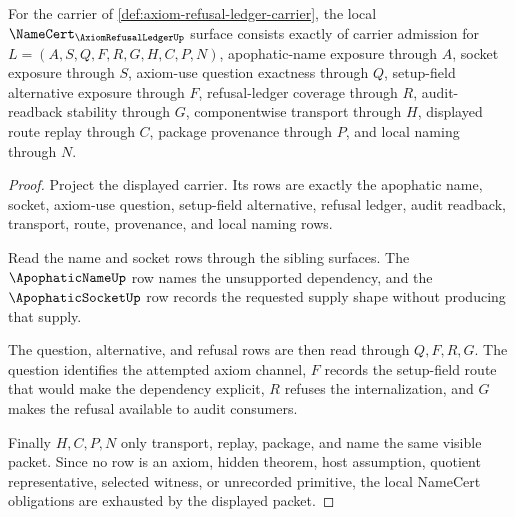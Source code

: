 \begin{theorem}
\label{thm:axiom-refusal-ledger-namecert-obligations}
For the carrier of \autoref{def:axiom-refusal-ledger-carrier}, the local $\NameCert_{\AxiomRefusalLedgerUp}$ surface consists exactly of carrier admission for $L=(A,S,Q,F,R,G,H,C,P,N)$, apophatic-name exposure through $A$, socket exposure through $S$, axiom-use question exactness through $Q$, setup-field alternative exposure through $F$, refusal-ledger coverage through $R$, audit-readback stability through $G$, componentwise transport through $H$, displayed route replay through $C$, package provenance through $P$, and local naming through $N$.
\end{theorem}
\begin{proof}
Project the displayed carrier. Its rows are exactly the apophatic name, socket, axiom-use question, setup-field alternative, refusal ledger, audit readback, transport, route, provenance, and local naming rows.

Read the name and socket rows through the sibling surfaces. The $\ApophaticNameUp$ row names the unsupported dependency, and the $\ApophaticSocketUp$ row records the requested supply shape without producing that supply.

The question, alternative, and refusal rows are then read through $Q,F,R,G$. The question identifies the attempted axiom channel, $F$ records the setup-field route that would make the dependency explicit, $R$ refuses the internalization, and $G$ makes the refusal available to audit consumers.

Finally $H,C,P,N$ only transport, replay, package, and name the same visible packet. Since no row is an axiom, hidden theorem, host assumption, quotient representative, selected witness, or unrecorded primitive, the local NameCert obligations are exhausted by the displayed packet.
\end{proof}

